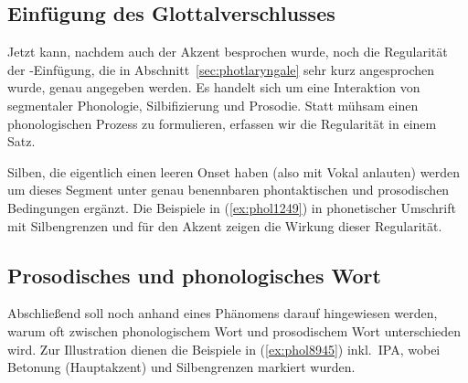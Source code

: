 \subsection{Einfügung des Glottalverschlusses}

Jetzt kann, nachdem auch der Akzent besprochen wurde, noch die Regularität der \textipa{[P]}-Einfügung, die in Abschnitt~\ref{sec:photlaryngale} sehr kurz angesprochen wurde, genau angegeben werden.
Es handelt sich um eine Interaktion von segmentaler Phonologie, Silbifizierung und Prosodie.
Statt mühsam einen phonologischen Prozess zu formulieren, erfassen wir die Regularität in einem Satz.


Silben, die eigentlich einen leeren Onset haben (also mit Vokal anlauten) werden um dieses Segment unter genau benennbaren phontaktischen und prosodischen Bedingungen ergänzt.
Die Beispiele in (\ref{ex:phol1249}) in phonetischer Umschrift mit Silbengrenzen und \textipa{[\textprimstress]} für den Akzent zeigen die Wirkung dieser Regularität.

\begin{exe}
  \ex\label{ex:phol1249}
  \begin{xlist}
  \end{xlist}
\end{exe}

\subsection{Prosodisches und phonologisches Wort}

\label{sec:prosphonwort}

Abschließend soll noch anhand eines Phänomens darauf hingewiesen werden, warum oft zwischen phonologischem Wort und prosodischem Wort unterschieden wird.
Zur Illustration dienen die Beispiele in (\ref{ex:phol8945}) inkl.\ IPA, wobei Betonung (Hauptakzent) und Silbengrenzen markiert wurden.

